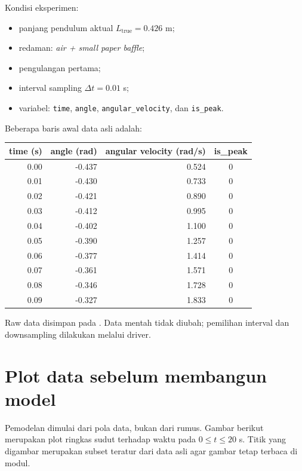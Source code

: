 \documentclass[book,english,noindex,lean,nobackpage,nocopyright,noupdate,nofiglist,notablist]{enacom}
\begin{document}
Kondisi eksperimen:
\begin{itemize}
\item panjang pendulum aktual $L_{\mathrm{true}}=0.426$ m;
\item redaman: \textit{air + small paper baffle};
\item pengulangan pertama;
\item interval sampling $\Delta t=0.01$ s;
\item variabel: \texttt{time}, \texttt{angle}, \texttt{angular\_velocity}, dan \texttt{is\_peak}.
\end{itemize}

Beberapa baris awal data asli adalah:
\begin{center}
\small
\begin{tabular}{r r r c}
\hline
\textbf{time (s)} & \textbf{angle (rad)} & \textbf{angular velocity (rad/s)} & \textbf{is\_peak}\\
\hline
0.00 & -0.437 & 0.524 & 0\\
0.01 & -0.430 & 0.733 & 0\\
0.02 & -0.421 & 0.890 & 0\\
0.03 & -0.412 & 0.995 & 0\\
0.04 & -0.402 & 1.100 & 0\\
0.05 & -0.390 & 1.257 & 0\\
0.06 & -0.377 & 1.414 & 0\\
0.07 & -0.361 & 1.571 & 0\\
0.08 & -0.346 & 1.728 & 0\\
0.09 & -0.327 & 1.833 & 0\\
\hline
\end{tabular}
\end{center}

Raw data disimpan pada . Data mentah tidak diubah; pemilihan interval dan downsampling dilakukan melalui driver.

\section{Plot data sebelum membangun model}
Pemodelan dimulai dari pola data, bukan dari rumus. Gambar berikut merupakan plot ringkas sudut terhadap waktu pada $0\le t\le20$ s. Titik yang digambar merupakan subset teratur dari data asli agar gambar tetap terbaca di modul.
\end{document}
